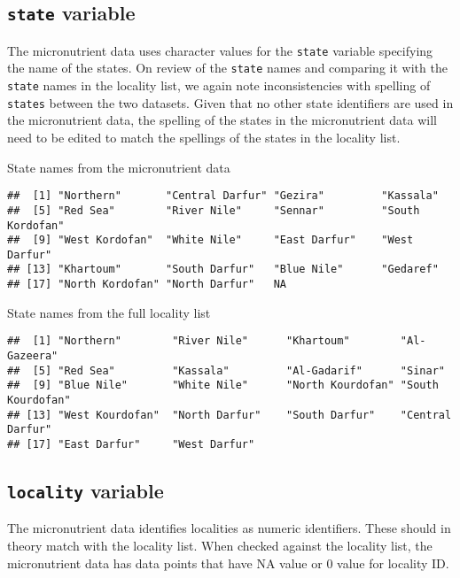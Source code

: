 \documentclass[12pt,a4paper]{article}
\begin{document}
\hypertarget{state-variable}{%
\subsection{\texorpdfstring{\texttt{state} variable}{state variable}}\label{state-variable}}

The micronutrient data uses character values for the \texttt{state} variable specifying the name of the states. On review of the \texttt{state} names and comparing it with the \texttt{state} names in the locality list, we again note inconsistencies with spelling of \texttt{states} between the two datasets. Given that no other state identifiers are used in the micronutrient data, the spelling of the states in the micronutrient data will need to be edited to match the spellings of the states in the locality list.

State names from the micronutrient data

\begin{verbatim}
##  [1] "Northern"       "Central Darfur" "Gezira"         "Kassala"       
##  [5] "Red Sea"        "River Nile"     "Sennar"         "South Kordofan"
##  [9] "West Kordofan"  "White Nile"     "East Darfur"    "West Darfur"   
## [13] "Khartoum"       "South Darfur"   "Blue Nile"      "Gedaref"       
## [17] "North Kordofan" "North Darfur"   NA
\end{verbatim}

State names from the full locality list

\begin{verbatim}
##  [1] "Northern"        "River Nile"      "Khartoum"        "Al-Gazeera"     
##  [5] "Red Sea"         "Kassala"         "Al-Gadarif"      "Sinar"          
##  [9] "Blue Nile"       "White Nile"      "North Kourdofan" "South Kourdofan"
## [13] "West Kourdofan"  "North Darfur"    "South Darfur"    "Central Darfur" 
## [17] "East Darfur"     "West Darfur"
\end{verbatim}

\hypertarget{locality-variable}{%
\subsection{\texorpdfstring{\texttt{locality} variable}{locality variable}}\label{locality-variable}}

The micronutrient data identifies localities as numeric identifiers. These should in theory match with the locality list. When checked against the locality list, the micronutrient data has data points that have NA value or 0 value for locality ID.
\end{document}
